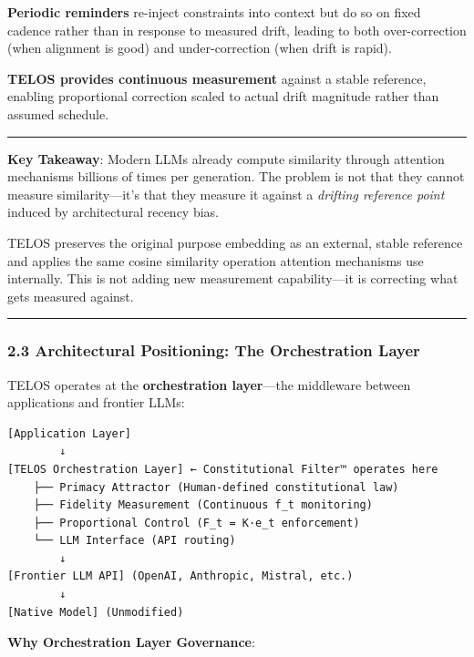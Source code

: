 \textbf{Periodic reminders} re-inject constraints into context but do so
on fixed cadence rather than in response to measured drift, leading to
both over-correction (when alignment is good) and under-correction (when
drift is rapid).

\textbf{TELOS provides continuous measurement} against a stable
reference, enabling proportional correction scaled to actual drift
magnitude rather than assumed schedule.

\begin{center}\rule{0.5\linewidth}{0.5pt}\end{center}

\textbf{Key Takeaway}: Modern LLMs already compute similarity through
attention mechanisms billions of times per generation. The problem is
not that they cannot measure similarity---it's that they measure it
against a \emph{drifting reference point} induced by architectural
recency bias.

TELOS preserves the original purpose embedding as an external, stable
reference and applies the same cosine similarity operation attention
mechanisms use internally. This is not adding new measurement
capability---it is correcting what gets measured against.

\begin{center}\rule{0.5\linewidth}{0.5pt}\end{center}

\subsubsection{2.3 Architectural Positioning: The Orchestration
Layer}\label{architectural-positioning-the-orchestration-layer}

TELOS operates at the \textbf{orchestration layer}---the middleware
between applications and frontier LLMs:

\begin{verbatim}
[Application Layer]
        ↓
[TELOS Orchestration Layer] ← Constitutional Filter™ operates here
    ├── Primacy Attractor (Human-defined constitutional law)
    ├── Fidelity Measurement (Continuous f_t monitoring)
    ├── Proportional Control (F_t = K·e_t enforcement)
    └── LLM Interface (API routing)
        ↓
[Frontier LLM API] (OpenAI, Anthropic, Mistral, etc.)
        ↓
[Native Model] (Unmodified)
\end{verbatim}

\textbf{Why Orchestration Layer Governance}:

